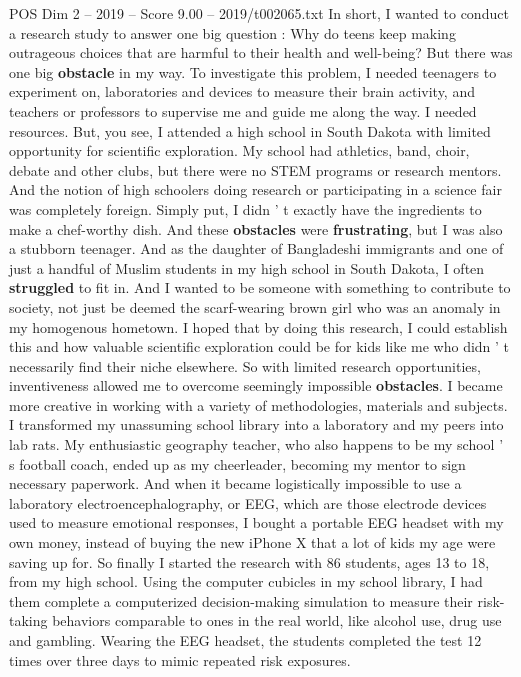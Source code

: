 \begin{textsample}{POS Dim 2 – 2019 – Score 9.00 – 2019/t002065.txt}
In short, I wanted to conduct a research study to answer one big question : Why do teens keep making outrageous choices that are harmful to their health and well-being?
But there was one big \textbf{obstacle} in my way.
To investigate this problem, I needed teenagers to experiment on, laboratories and devices to measure their brain activity, and teachers or professors to supervise me and guide me along the way.
I needed resources.
But, you see, I attended a high school in South Dakota with limited opportunity for scientific exploration.
My school had athletics, band, choir, debate and other clubs, but there were no STEM programs or research mentors.
And the notion of high schoolers doing research or participating in a science fair was completely foreign.
Simply put, I didn ' t exactly have the ingredients to make a chef-worthy dish.
And these \textbf{obstacles} were \textbf{frustrating}, but I was also a stubborn teenager.
And as the daughter of Bangladeshi immigrants and one of just a handful of Muslim students in my high school in South Dakota, I often \textbf{struggled} to fit in.
And I wanted to be someone with something to contribute to society, not just be deemed the scarf-wearing brown girl who was an anomaly in my homogenous hometown.
I hoped that by doing this research, I could establish this and how valuable scientific exploration could be for kids like me who didn ' t necessarily find their niche elsewhere.
So with limited research opportunities, inventiveness allowed me to overcome seemingly impossible \textbf{obstacles}.
I became more creative in working with a variety of methodologies, materials and subjects.
I transformed my unassuming school library into a laboratory and my peers into lab rats.
My enthusiastic geography teacher, who also happens to be my school ' s football coach, ended up as my cheerleader, becoming my mentor to sign necessary paperwork.
And when it became logistically impossible to use a laboratory electroencephalography, or EEG, which are those electrode devices used to measure emotional responses, I bought a portable EEG headset with my own money, instead of buying the new iPhone X that a lot of kids my age were saving up for.
So finally I started the research with 86 students, ages 13 to 18, from my high school.
Using the computer cubicles in my school library, I had them complete a computerized decision-making simulation to measure their risk-taking behaviors comparable to ones in the real world, like alcohol use, drug use and gambling.
Wearing the EEG headset, the students completed the test 12 times over three days to mimic repeated risk exposures.

\end{textsample}
